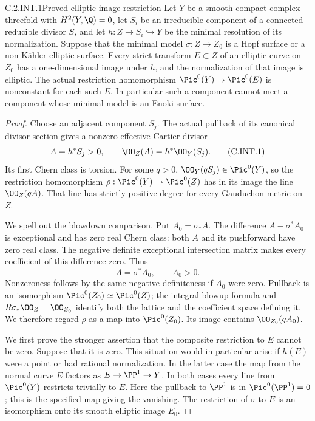 \begin{idstatement}{C.2.INT.1}{Proved elliptic-image restriction}
\label{st:C.2.INT.1}
Let $Y$ be a smooth compact complex threefold with
$H^2(Y,\Q)=0$, let $S_i$ be an irreducible component of
a connected reducible divisor $S$, and let
$h:Z\to S_i\hookrightarrow Y$ be the minimal resolution
of its normalization. Suppose that the minimal model
$\sigma:Z\to Z_0$ is a Hopf surface or a non-K\"ahler
elliptic surface. Every strict transform $E\subset Z$ of
an elliptic curve on $Z_0$ has a one-dimensional image
under $h$, and the normalization of that image is elliptic.
The actual restriction homomorphism
$\Pic^0(Y)\to\Pic^0(E)$ is nonconstant for each such $E$.
In particular such a component cannot meet a component
whose minimal model is an Enoki surface.
\end{idstatement}
\begin{proof}
Choose an adjacent component $S_j$. The actual pullback
of its canonical divisor section gives a nonzero effective
Cartier divisor
\[
 A=h^*S_j>0,\qquad \OO_Z(A)=h^*\OO_Y(S_j).
 \tag{C.INT.1}
\]
Its first Chern class is torsion. For some $q>0$,
$\OO_Y(qS_j)\in\Pic^0(Y)$, so the restriction homomorphism
$\rho:\Pic^0(Y)\to\Pic^0(Z)$ has in its image the line
$\OO_Z(qA)$. That line has strictly positive degree for
every Gauduchon metric on $Z$.

We spell out the blowdown comparison. Put $A_0=\sigma_*A$.
The difference $A-\sigma^*A_0$ is exceptional and has
zero real Chern class: both $A$ and its pushforward have
zero real class. The negative definite exceptional
intersection matrix makes every coefficient of this
difference zero. Thus
\[
 A=\sigma^*A_0,\qquad A_0>0.
 \tag{C.INT.2}
\]
Nonzeroness follows by the same negative definiteness if
$A_0$ were zero. Pullback is an isomorphism
$\Pic^0(Z_0)\simeq\Pic^0(Z)$; the integral blowup
formula and $R\sigma_*\OO_Z=\OO_{Z_0}$ identify both
the lattice and the coefficient space defining it.
We therefore regard $\rho$ as a map into $\Pic^0(Z_0)$.
Its image contains $\OO_{Z_0}(qA_0)$.

We first prove the stronger assertion that the composite
restriction to $E$ cannot be zero. Suppose that it is zero.
This situation would in particular arise if $h(E)$ were
a point or had rational normalization.
In the latter case the map from the normal curve $E$
factors as $E\to\PP^1\to Y$. In both cases every line
from $\Pic^0(Y)$ restricts trivially to $E$. Here the
pullback to $\PP^1$ is in $\Pic^0(\PP^1)=0$; this is
the specified map giving the vanishing. The restriction
of $\sigma$ to $E$ is an isomorphism onto its smooth
elliptic image $E_0$.


\end{proof}

